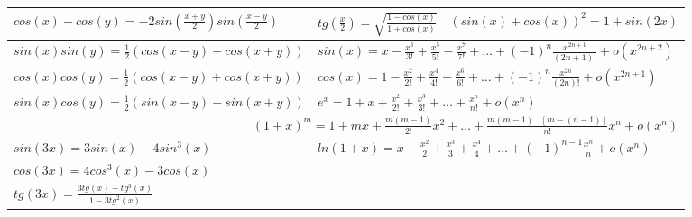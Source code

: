 \begin{tabular}{l|l|l}
    $\displaystyle cos(x) - cos(y) = -2sin\left(\frac{x +  y}{2}\right)sin\left(\frac{x - y}{2}\right)$ &
    $\displaystyle tg\left(\frac{x}{2}\right) = \sqrt{\frac{1 - cos(x)}{1 + cos(x)}}$ &
    $\displaystyle (sin(x) + cos(x))^2 = 1 + sin(2x)$ \\  
    \hline
    
    $\displaystyle sin(x)sin(y) = \frac{1}{2}(cos(x - y) - cos(x + y))$ &
    \multicolumn{2}{l}{$\displaystyle sin(x) = x - \frac{x^3}{3!} + \frac{x^5}{5!} - \frac{x^7}{7!} + \ldots + (-1)^n\frac{x^{2n + 1}}{(2n + 1)!} + o(x^{2n+2})$}  \\  
    
    $\displaystyle cos(x)cos(y) = \frac{1}{2}(cos(x - y) + cos(x + y))$ &
    \multicolumn{2}{l}{$\displaystyle cos(x) = 1 - \frac{x^2}{2!} + \frac{x^4}{4!} - \frac{x^6}{6!} + \ldots + (-1)^n \frac{x^{2n}}{(2n)!} + o(x^{2n+1})$}  \\  
    
    $\displaystyle sin(x)cos(y) = \frac{1}{2}(sin(x - y) + sin(x + y))$ & 
    \multicolumn{2}{l}{$\displaystyle e^x = 1 + x + \frac{x^2}{2!} + \frac{x^3}{3!} + \ldots + \frac{x^n}{n!} + o(x^n)$}  \\ \cline{1-1}  
    
    \multicolumn{3}{r}{$\displaystyle (1 + x)^m = 1 + mx +\frac{m(m-1)}{2!}x^2 + \ldots + \frac{m(m-1)\ldots[m-(n-1)]}{n!}x^n + o(x^n)$}  \\   
    \cline{1-1}
    
    $\displaystyle sin(3x) = 3sin(x) - 4sin^3(x)$ &
    \multicolumn{2}{l}{$\displaystyle ln(1+x) = x - \frac{x^2}{2} + \frac{x^3}{3} + \frac{x^4}{4} + \ldots + (-1)^{n-1}\frac{x^n}{n} + o(x^n)$}  \\  
    
    $\displaystyle cos(3x) = 4cos^3(x) - 3cos(x)$ &
    \multicolumn{2}{c}{} \\
    
    $\displaystyle tg(3x) = \frac{3tg(x) - tg^3(x)}{1 - 3tg^2(x)}$ &
    \multicolumn{2}{c}{} \\
    \hline
    
\end{tabular}